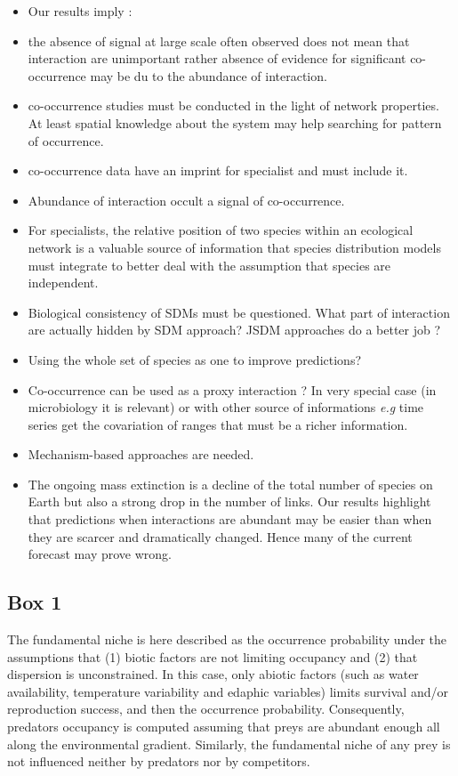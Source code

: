 \begin{itemize}
\item
  Our results imply :
\item
  the absence of signal at large scale often observed does not mean that
  interaction are unimportant rather absence of evidence for significant
  co-occurrence may be du to the abundance of interaction.
\item
  co-occurrence studies must be conducted in the light of network
  properties. At least spatial knowledge about the system may help
  searching for pattern of occurrence.
\item
  co-occurrence data have an imprint for specialist and must include it.
\item
  Abundance of interaction occult a signal of co-occurrence.
\item
  For specialists, the relative position of two species within an
  ecological network is a valuable source of information that species
  distribution models must integrate to better deal with the assumption
  that species are independent.
\item
  Biological consistency of SDMs must be questioned. What part of
  interaction are actually hidden by SDM approach? JSDM approaches do a
  better job ?
\item
  Using the whole set of species as one to improve predictions?
\item
  Co-occurrence can be used as a proxy interaction ? In very special
  case (in microbiology it is relevant) or with other source of
  informations \emph{e.g} time series get the covariation of ranges that
  must be a richer information.
\item
  Mechanism-based approaches are needed.
\item
  The ongoing mass extinction is a decline of the total number of
  species on Earth but also a strong drop in the number of links. Our
  results highlight that predictions when interactions are abundant may
  be easier than when they are scarcer and dramatically changed. Hence
  many of the current forecast may prove wrong.
\end{itemize}

\newpage

\subsection{Box 1}\label{box-1}

The fundamental niche is here described as the occurrence probability
under the assumptions that (1) biotic factors are not limiting occupancy
and (2) that dispersion is unconstrained. In this case, only abiotic
factors (such as water availability, temperature variability and edaphic
variables) limits survival and/or reproduction success, and then the
occurrence probability. Consequently, predators occupancy is computed
assuming that preys are abundant enough all along the environmental
gradient. Similarly, the fundamental niche of any prey is not influenced
neither by predators nor by competitors.

